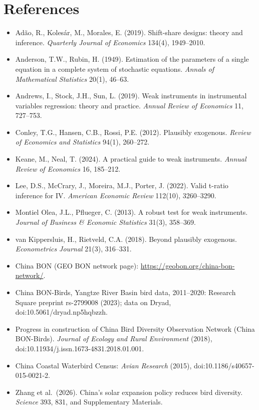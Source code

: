 \documentclass[11pt]{article}
\begin{document}
\appendix
\section{References}
\begin{itemize}[leftmargin=14pt,itemsep=1pt]
\item Ad\~ao, R., Koles\'ar, M., Morales, E. (2019). Shift-share designs: theory and inference. \textit{Quarterly Journal of Economics} 134(4), 1949--2010.
\item Anderson, T.W., Rubin, H. (1949). Estimation of the parameters of a single equation in a complete system of stochastic equations. \textit{Annals of Mathematical Statistics} 20(1), 46--63.
\item Andrews, I., Stock, J.H., Sun, L. (2019). Weak instruments in instrumental variables regression: theory and practice. \textit{Annual Review of Economics} 11, 727--753.
\item Conley, T.G., Hansen, C.B., Rossi, P.E. (2012). Plausibly exogenous. \textit{Review of Economics and Statistics} 94(1), 260--272.
\item Keane, M., Neal, T. (2024). A practical guide to weak instruments. \textit{Annual Review of Economics} 16, 185--212.
\item Lee, D.S., McCrary, J., Moreira, M.J., Porter, J. (2022). Valid t-ratio inference for IV. \textit{American Economic Review} 112(10), 3260--3290.
\item Montiel Olea, J.L., Pflueger, C. (2013). A robust test for weak instruments. \textit{Journal of Business \& Economic Statistics} 31(3), 358--369.
\item van Kippersluis, H., Rietveld, C.A. (2018). Beyond plausibly exogenous. \textit{Econometrics Journal} 21(3), 316--331.
\item China BON (GEO BON network page): \url{https://geobon.org/china-bon-network/}.
\item China BON-Birds, Yangtze River Basin bird data, 2011--2020: Research Square preprint rs-2799008 (2023); data on Dryad, doi:10.5061/dryad.np5hqbzzh.
\item Progress in construction of China Bird Diversity Observation Network (China BON-Birds). \textit{Journal of Ecology and Rural Environment} (2018), doi:10.11934/j.issn.1673-4831.2018.01.001.
\item China Coastal Waterbird Census: \textit{Avian Research} (2015), doi:10.1186/s40657-015-0021-2.
\item Zhang et al.\ (2026). China's solar expansion policy reduces bird diversity. \textit{Science} 393, 831, and Supplementary Materials.
\end{itemize}
\end{document}
